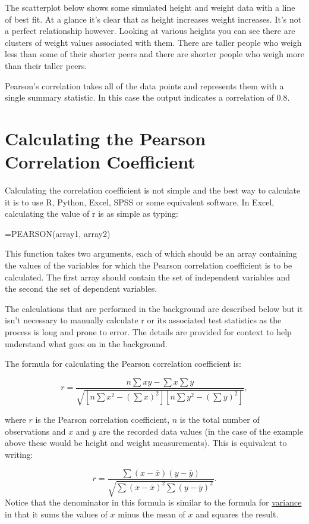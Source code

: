 \documentclass[
]{book}
\begin{document}
The scatterplot below shows some simulated height and weight data with a line of best fit. At a glance it's clear that as height increases weight increases. It's not a perfect relationship however. Looking at various heights you can see there are clusters of weight values associated with them. There are taller people who weigh less than some of their shorter peers and there are shorter people who weigh more than their taller peers.

Pearson's correlation takes all of the data points and represents them with a single summary statistic. In this case the output indicates a correlation of 0.8.

\hypertarget{calculating-the-pearson-correlation-coefficient}{%
\section{Calculating the Pearson Correlation Coefficient}\label{calculating-the-pearson-correlation-coefficient}}

Calculating the correlation coefficient is not simple and the best way to calculate it is to use R, Python, Excel, SPSS or some equivalent software. In Excel, calculating the value of r is as simple as typing:

=PEARSON(array1, array2)

This function takes two arguments, each of which should be an array containing the values of the variables for which the Pearson correlation coefficient is to be calculated. The first array should contain the set of independent variables and the second the set of dependent variables.

The calculations that are performed in the background are described below but it isn't necessary to manually calculate r or its associated test statistics as the process is long and prone to error. The details are provided for context to help understand what goes on in the background.

The formula for calculating the Pearson correlation coefficient is:

\[r = \frac{n \sum{xy}-\sum{x} \sum{y}}{\sqrt{[n \sum{x^2}-(\sum{x})^2][n \sum{y^2}-(\sum{y})^2]}}, \]

where \(r\) is the Pearson correlation coefficient, \(n\) is the total number of observations and \(x\) and \(y\) are the recorded data values (in the case of the example above these would be height and weight measurements). This is equivalent to writing:

\[r=\frac{\sum{(x-\bar{x})(y-\bar{y})}}{\sqrt{\sum{(x-\bar{x})^2}\sum{(y-\bar{y})^2}}}.\]
Notice that the denominator in this formula is similar to the formula for \protect\hyperlink{varr}{variance} in that it sums the values of \(x\) minus the mean of \(x\) and squares the result.
\end{document}
